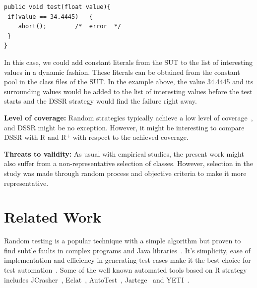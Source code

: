 \bigskip
\bigskip
\begin{lstlisting}
public void test(float value){
 if(value == 34.4445)   {
 	abort(); 		/*  error  */
 }
}
\end{lstlisting}
\bigskip
\bigskip

In this case, we could add constant literals from the SUT to the list of interesting values in a dynamic fashion. These literals can be obtained from the constant pool in the class files of the SUT. In the example above, the value 34.4445 and its surrounding values would  be added to the list of interesting values before the test starts and the DSSR strategy would find the failure right away.

\textbf{Level of coverage:} Random strategies typically achieve a low level of coverage~\cite{oriol2010yeti}, and DSSR might be no exception. However, it might be interesting to compare DSSR with R and R$^+$ with respect to the achieved coverage.

\textbf{Threats to validity:} As usual with empirical studies, the present work might also suffer from a non-representative selection of classes. However, selection in the study was made through random process and objective criteria to make it more representative.




\section{Related Work}\label{sec:rw}

Random testing is a popular technique with a simple algorithm but proven to find subtle faults in complex programs and Java libraries~\cite{csallner2004jcrasher, pacheco2005eclat,claessen2011quickcheck}. It's simplicity, ease of implementation and efficiency in generating test cases make it the best choice for test automation~\cite{hamlet1994random}. Some of the well known automated tools based on R strategy includes JCrasher~\cite{csallner2004jcrasher}, Eclat~\cite{pacheco2005eclat}, AutoTest~\cite{ciupa2007experimental, ciupa2008artoo}, Jartege~\cite{oriat2005jartege} and YETI~\cite{oriol2010yeti, oriol2012random}.

